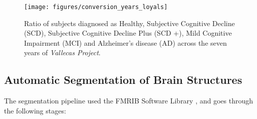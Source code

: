 \documentclass[11pt]{article}
\theoremstyle{definition}
\theoremstyle{remark}
\begin{document}
\begin{figure}[H]
        \centering
        \texttt{[image: figures/conversion\_years\_loyals]}
        \caption{Ratio of subjects diagnosed as Healthy, Subjective Cognitive Decline (SCD), Subjective Cognitive Decline Plus (SCD +), Mild Cognitive Impairment (MCI) and Alzheimer's disease (AD) across the seven years of \emph{Vallecas Project}.} 
        \label{fig:diag1}
\end{figure}

\subsection{Automatic Segmentation of Brain Structures}
\label{sse:mri}

The segmentation pipeline used the FMRIB Software Library \cite{fsl60}, \cite{jenkinson2012fsl} and goes through the following stages:
\cite{hannoun2018automatic}
\end{document}
